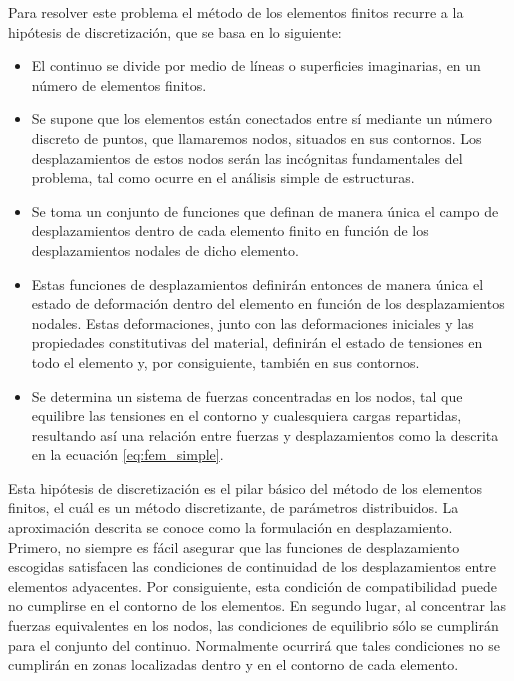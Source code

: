 Para resolver este problema el método de los elementos finitos recurre a la hipótesis de 
discretización, que se basa en lo siguiente: ~\cite{zienkiewicz2005}

\begin{itemize}
\item El continuo se divide por medio de líneas o superficies imaginarias, en un número 
de elementos finitos.
\item Se supone que los elementos están conectados entre sí mediante un número discreto de puntos, 
que llamaremos nodos, situados en sus contornos. Los desplazamientos de estos nodos serán las 
incógnitas fundamentales del problema, tal como ocurre en el análisis simple de estructuras.
\item Se toma un conjunto de funciones que definan de manera única el campo de desplazamientos 
dentro de cada elemento finito en función de los desplazamientos nodales de dicho elemento.
\item Estas funciones de desplazamientos definirán entonces de manera única el estado de 
deformación dentro del elemento en función de los desplazamientos nodales. Estas deformaciones, 
junto con las deformaciones iniciales y las propiedades constitutivas del material, definirán el 
estado de tensiones en todo el elemento y, por consiguiente, también en sus contornos.
\item Se determina un sistema de fuerzas concentradas en los nodos, tal que equilibre las tensiones 
en el contorno y cualesquiera cargas repartidas, resultando así una relación entre fuerzas y 
desplazamientos como la descrita en la ecuación \ref{eq:fem_simple}.
\end{itemize}

Esta hipótesis de discretización es el pilar básico del método de los elementos finitos, 
el cuál es un método discretizante, de parámetros distribuidos. La aproximación descrita 
se conoce como la formulación en desplazamiento. ~\cite{celigueta2011} \\

Primero, no siempre es fácil asegurar que las funciones de desplazamiento escogidas satisfacen las 
condiciones de continuidad de los desplazamientos entre elementos adyacentes. Por consiguiente, 
esta condición de compatibilidad puede no cumplirse en el contorno de los elementos. 
En segundo lugar, al concentrar las fuerzas equivalentes en los nodos, las condiciones de 
equilibrio sólo se cumplirán para el conjunto del continuo. Normalmente ocurrirá que tales 
condiciones no se cumplirán en zonas localizadas dentro y en el contorno de cada 
elemento. ~\cite{zienkiewicz2005} \\

